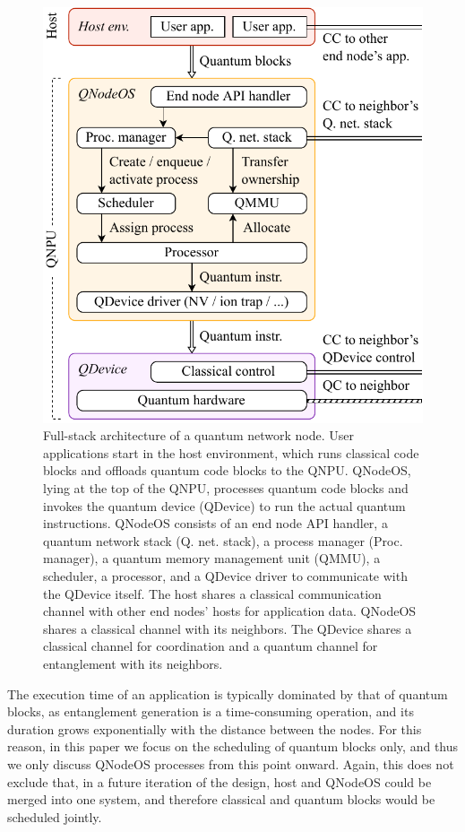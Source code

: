 \begin{figure}
    \centering
    \includegraphics[width=0.6\linewidth]{figures/quantum-node.pdf}
    \caption{
        Full-stack architecture of a quantum network node. User applications start in the host
        environment, which runs classical code blocks and offloads quantum code blocks to the QNPU.
        QNodeOS, lying at the top of the QNPU, processes quantum code blocks and invokes the quantum
        device (QDevice) to run the actual quantum instructions. QNodeOS consists of an end node API
        handler, a quantum network stack (Q. net. stack), a process manager (Proc. manager), a quantum
        memory management unit (QMMU), a scheduler, a processor, and a QDevice driver to communicate
        with the QDevice itself. The host shares a classical communication channel with other end nodes'
        hosts for application data. QNodeOS shares a classical channel with its neighbors. The QDevice
        shares a classical channel for coordination and a quantum channel for entanglement with its
        neighbors.}
    \label{fig:quantum-node}
\end{figure}

The execution time of an application is typically dominated by that of quantum blocks, as
entanglement generation is a time-consuming operation, and its duration grows exponentially with the
distance between the nodes. For this reason, in this paper we focus on the scheduling of quantum
blocks only, and thus we only discuss QNodeOS processes from this point onward. Again, this does not
exclude that, in a future iteration of the design, host and QNodeOS could be merged into one system,
and therefore classical and quantum blocks would be scheduled jointly.

